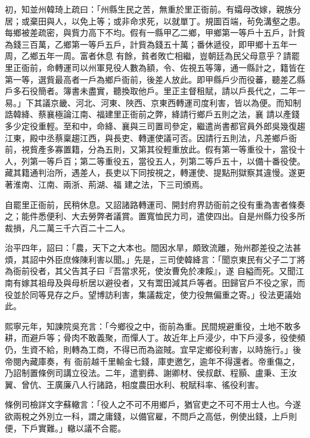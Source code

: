 \begin{pinyinscope}
 初，知並州韓琦上疏曰：「州縣生民之苦，無重於里正衙前。有孀母改嫁，親族分居；或棄田與人，以免上等；或非命求死，以就單丁。規圖百端，茍免溝壑之患。每鄉被差疏密，與貲力高下不均。假有一縣甲乙二鄉，甲鄉第一等戶十五戶，計貲為錢三百萬，乙鄉第一等戶五戶，計貲為錢五十萬；番休遞役，即甲鄉十五年一周，乙鄉五年一周。富者休息
 有餘，貧者敗亡相繼，豈朝廷為民父母意乎？請罷里正衙前，命轉運司以州軍見役人數為額，令、佐視五等簿，通一縣計之，籍皆在第一等，選貲最高者一戶為鄉戶衙前，後差人放此。即甲縣戶少而役蕃，聽差乙縣戶多石役簡者。簿書未盡實，聽換取他戶。里正主督租賦，請以戶長代之，二年一易。」下其議京畿、河北、河東、陜西、京東西轉運司度利害，皆以為便。而知制誥韓絳、蔡襄極論江南、福建里正衙前之弊，絳請行鄉戶五則之法，襄
 請以產錢多少定役重輕。至和中，命絳、襄與三司置司參定，繼遣尚書都官員外郎吳幾復趨江東，殿中丞蔡稟趨江西，與長吏、轉運使議可否。因請行五則法，凡差鄉戶衙前，視貲產多寡置籍，分為五則，又第其役輕重放此。假有第一等重役十，當役十人，列第一等戶百；第二等重役五，當役五人，列第二等戶五十，以備十番役使。藏其籍通判治所，遇差人，長吏以下同按視之，轉運使、提點刑獄察其違慢。遂更著淮南、江南、兩浙、荊湖、福
 建之法，下三司頒焉。



 自罷里正衙前，民稍休息。又詔諸路轉運司、開封府界訪衙前之役有重為害者條奏之；能件悉便利、大去勞弊者議賞。置寬恤民力司，遣使四出。自是州縣力役多所裁損，凡二萬三千六百二十二人。



 治平四年，詔曰：「農，天下之大本也。間因水旱，頗致流離，殆州郡差役之法甚煩，其詔中外臣庶條陳利害以聞。」先是，三司使韓絳言：「聞京東民有父子二丁將為衙前役者，其父告其子曰『吾當求死，使汝曹免於凍餒』，遂
 自縊而死。又聞江南有嫁其祖母及與母析居以避役者，又有鬻田減其戶等者。田歸官戶不役之家，而役並於同等見存之戶。望博訪利害，集議裁定，使力役無偏重之寄。」役法更議始此。



 熙寧元年，知諫院吳充言：「今鄉役之中，衙前為重。民間規避重役，土地不敢多耕，而避戶等；骨肉不敢義聚，而憚人丁。故近年上戶浸少，中下戶浸多，役使頻仍，生資不給，則轉為工商，不得已而為盜賊。宜早定鄉役利害，以時施行。」後帝閱內藏庫奏，有
 衙前越千里輸金七錢，庫吏邀乞，逾年不得還者。帝重傷之，乃詔制置條例司講立役法。二年，遣劉彞、謝卿材、侯叔獻、程顥、盧秉、王汝翼、曾伉、王廣廉八人行諸路，相度農田水利、稅賦科率、徭役利害。



 條例司檢詳文字蘇轍言：「役人之不可不用鄉戶，猶官吏之不可不用士人也。今遂欲兩稅之外別立一科，謂之庸錢，以備官雇，不問戶之高低，例使出錢，上戶則便，下戶實難。」轍以議不合罷。




\end{pinyinscope}
